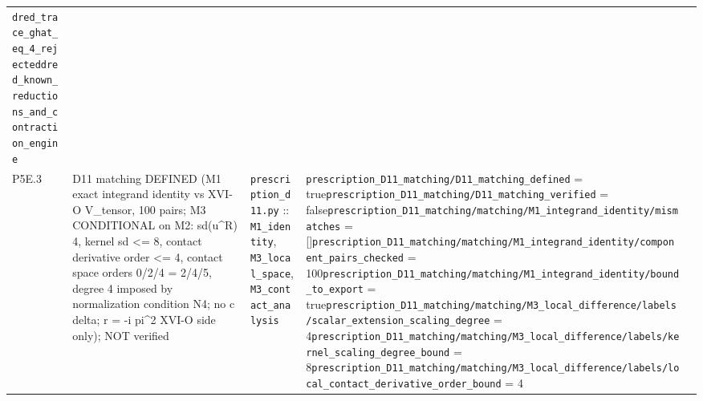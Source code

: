 {\begin{longtable}{@{}p{0.9cm}p{4.1cm}p{3.5cm}p{5.0cm}p{3.0cm}@{}}
\texttt{dred\_\allowbreak{}trace\_\allowbreak{}ghat\_\allowbreak{}eq\_\allowbreak{}4\_\allowbreak{}rejected}\newline \texttt{dred\_\allowbreak{}known\_\allowbreak{}reductions\_\allowbreak{}and\_\allowbreak{}contraction\_\allowbreak{}engine} \\
P5E.3 & D11 matching DEFINED (M1 exact integrand identity vs XVI-O V\_tensor, 100 pairs; M3 CONDITIONAL on M2: sd(u\^{}R) 4, kernel sd \textless{}= 8, contact derivative order \textless{}= 4, contact space orders 0/2/4 = 2/4/5, degree 4 imposed by normalization condition N4; no c delta; r = -i pi\^{}2 XVI-O side only); NOT verified & \texttt{prescription\_\allowbreak{}d11.\allowbreak{}py} :: \texttt{M1\_\allowbreak{}identity}, \texttt{M3\_\allowbreak{}local\_\allowbreak{}space}, \texttt{M3\_\allowbreak{}contact\_\allowbreak{}analysis} & \texttt{\allowbreak{}prescription\_\allowbreak{}D11\_\allowbreak{}matching/\allowbreak{}D11\_\allowbreak{}matching\_\allowbreak{}defined} = true\newline \texttt{\allowbreak{}prescription\_\allowbreak{}D11\_\allowbreak{}matching/\allowbreak{}D11\_\allowbreak{}matching\_\allowbreak{}verified} = false\newline \texttt{\allowbreak{}prescription\_\allowbreak{}D11\_\allowbreak{}matching/\allowbreak{}matching/\allowbreak{}M1\_\allowbreak{}integrand\_\allowbreak{}identity/\allowbreak{}mismatches} = []\newline \texttt{\allowbreak{}prescription\_\allowbreak{}D11\_\allowbreak{}matching/\allowbreak{}matching/\allowbreak{}M1\_\allowbreak{}integrand\_\allowbreak{}identity/\allowbreak{}component\_\allowbreak{}pairs\_\allowbreak{}checked} = 100\newline \texttt{\allowbreak{}prescription\_\allowbreak{}D11\_\allowbreak{}matching/\allowbreak{}matching/\allowbreak{}M1\_\allowbreak{}integrand\_\allowbreak{}identity/\allowbreak{}bound\_\allowbreak{}to\_\allowbreak{}export} = true\newline \texttt{\allowbreak{}prescription\_\allowbreak{}D11\_\allowbreak{}matching/\allowbreak{}matching/\allowbreak{}M3\_\allowbreak{}local\_\allowbreak{}difference/\allowbreak{}labels/\allowbreak{}scalar\_\allowbreak{}extension\_\allowbreak{}scaling\_\allowbreak{}degree} = 4\newline \texttt{\allowbreak{}prescription\_\allowbreak{}D11\_\allowbreak{}matching/\allowbreak{}matching/\allowbreak{}M3\_\allowbreak{}local\_\allowbreak{}difference/\allowbreak{}labels/\allowbreak{}kernel\_\allowbreak{}scaling\_\allowbreak{}degree\_\allowbreak{}bound} = 8\newline \texttt{\allowbreak{}prescription\_\allowbreak{}D11\_\allowbreak{}matching/\allowbreak{}matching/\allowbreak{}M3\_\allowbreak{}local\_\allowbreak{}difference/\allowbreak{}labels/\allowbreak{}local\_\allowbreak{}contact\_\allowbreak{}derivative\_\allowbreak{}order\_\allowbreak{}bound} = 4\newline 
\end{longtable}}
